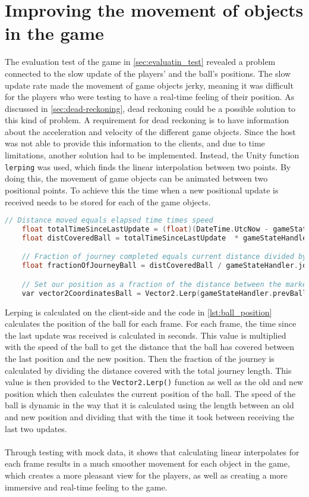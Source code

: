 \section{Improving the movement of objects in the game}
The evaluation test of the game in \autoref{sec:evaluatin_test} revealed a problem connected to the slow update of the players' and the ball's positions.
The slow update rate made the movement of game objects jerky, meaning it was difficult for the players who were testing to have a real-time feeling of their position.
As discussed in \autoref{sec:dead-reckoning}, dead reckoning could be a possible solution to this kind of problem.
A requirement for dead reckoning is to have information about the acceleration and velocity of the different game objects.
Since the host was not able to provide this information to the clients, and due to time limitations, another solution had to be implemented.
Instead, the Unity function \texttt{lerping} was used, which finds the linear interpolation between two points.
By doing this, the movement of game objects can be animated between two positional points.
To achieve this the time when a new positional update is received needs to be stored for each of the game objects.
\begin{lstlisting}[caption={Calculating the position of the ball}, captionpos=b,language=C,label={lst:ball_position}]
    // Distance moved equals elapsed time times speed
    float totalTimeSinceLastUpdate = (float)(DateTime.UtcNow - gameStateHandler.timeAtLastUpdateBall).TotalSeconds;
    float distCoveredBall = totalTimeSinceLastUpdate  * gameStateHandler.ballSpeed;

    // Fraction of journey completed equals current distance divided by total distance.
    float fractionOfJourneyBall = distCoveredBall / gameStateHandler.journeyLengthBall;

    // Set our position as a fraction of the distance between the markers.
    var vector2CoordinatesBall = Vector2.Lerp(gameStateHandler.prevBallPosition, gameStateHandler.newBallPosition, fractionOfJourneyBall);
\end{lstlisting}
Lerping is calculated on the client-side and the code in \autoref{lst:ball_position} calculates the position of the ball for each frame.
For each frame, the time since the last update was received is calculated in seconds.
This value is multiplied with the speed of the ball to get the distance that the ball has covered between the last position and the new position.
Then the fraction of the journey is calculated by dividing the distance covered with the total journey length.
This value is then provided to the \texttt{Vector2.Lerp()} function as well as the old and new position which then calculates the current position of the ball.
The speed of the ball is dynamic in the way that it is calculated using the length between an old and new position and dividing that with the time it took between receiving the last two updates.
\\\\
Through testing with mock data, it shows that calculating linear interpolates for each frame results in a much smoother movement for each object in the game, which creates a more pleasant view for the players, as well as creating a more immersive and real-time feeling to the game.
